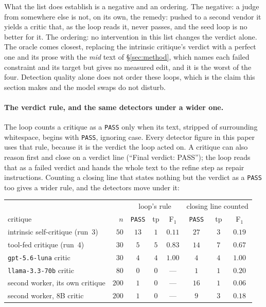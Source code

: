 \documentclass[11pt]{article}
\begin{document}
What the list does establish is a negative and an ordering. The negative: a judge from somewhere
else is not, on its own, the remedy: pushed to a second vendor it yields a critic that, as the
loop reads it, never passes, and the seed loop is no better for it. The ordering: no intervention in this list changes
the verdict alone. The oracle comes closest, replacing the intrinsic critique's verdict with a
perfect one and its prose with the \emph{mid} text of \S\ref{sec:method}, which names each failed
constraint and its target but gives no measured edit, and it is the worst of the four. Detection
quality alone does not order these loops, which is the claim this section makes and the model
swaps do not disturb.

\paragraph{The verdict rule, and the same detectors under a wider one.}
The loop counts a critique as a \texttt{PASS} only when its text, stripped of surrounding
whitespace, begins with \texttt{PASS}, ignoring case. Every detector figure in this paper uses that
rule, because it is the verdict the loop acted on. A critique can also reason first and close on a
verdict line (``Final verdict: PASS''); the loop reads that as a failed verdict and hands the whole
text to the refine step as repair instructions. Counting a closing line that states nothing but
the verdict as a \texttt{PASS} too gives a wider rule, and the detectors move under it:

\begin{center}\small
\begin{tabular}{lrcccccc}
\toprule
 & & \multicolumn{3}{c}{loop's rule} & \multicolumn{3}{c}{closing line counted} \\
critique & $n$ & \texttt{PASS} & tp & F$_1$ & \texttt{PASS} & tp & F$_1$ \\
\midrule
intrinsic self-critique (run~3) & $50$ & $13$ & $1$ & $0.11$ & $27$ & $3$ & $0.19$ \\
tool-fed critique (run~4) & $30$ & $5$ & $5$ & $0.83$ & $14$ & $7$ & $0.67$ \\
\texttt{gpt-5.6-luna} critic & $30$ & $4$ & $4$ & $1.00$ & $4$ & $4$ & $1.00$ \\
\texttt{llama-3.3-70b} critic & $80$ & $0$ & $0$ & --- & $1$ & $1$ & $0.20$ \\
second worker, its own critique & $200$ & $1$ & $0$ & --- & $16$ & $1$ & $0.06$ \\
second worker, 8B critic & $200$ & $1$ & $0$ & --- & $9$ & $3$ & $0.18$ \\
\bottomrule
\end{tabular}
\end{center}
\end{document}
